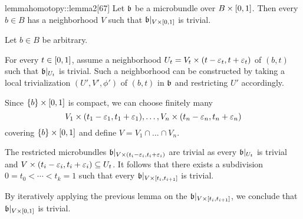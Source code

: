 \begin{mystatement}{lemma}{homotopy::lemma2}[67] Let $\bb$ be a microbundle over $B \times{} [0, 1]$. Then every $b \in B$ has a neighborhood $V$ such that $\bb[\cyl{V}]$ is trivial. \end{mystatement}

\begin{myproof} Let $b \in B$ be arbitrary.

For every $t \in [0, 1]$, assume a neighborhood $U_t = V_t \times (t - \varepsilon{}_t, t + \varepsilon{}_t)$ of $(b, t)$ such that $\bb[U_t]$ is trivial. Such a neighborhood can be constructed by taking a local trivialization $(U', V', \phi')$ of $(b, t)$ in $\bb$ and restricting $U'$ accordingly.

Since $\{b\} \times{} [0, 1]$ is compact, we can choose finitely many \[ V_1 \times (t_1 - \varepsilon{}_1, t_1 + \varepsilon{}_1), \dots, V_n \times (t_n - \varepsilon{}_n, t_n + \varepsilon{}_n) \] covering $\{b\} \times [0, 1]$ and define $V = V_1 \cap \dots \cap V_n$.

The restricted microbundles $\bb[V \cross (t_i - \eps_i, t_i + \eps_i)]$ are trivial as every $\bb[U_t]$ is trivial and $V \times (t_i - \varepsilon{}_i, t_i + \varepsilon{}_i) \subseteq{} U_t$. It follows that there exists a subdivision $0 = t_0 < \cdots < t_k = 1$ such that every $\bb[V \cross [t_{i}, t_{i + 1}]]$ is trivial.

By iteratively applying the previous lemma on the $\bb[V \cross [t_i, t_{i + 1}]]$, we conclude that $\bb[\cyl{V}]$ is trivial. \end{myproof}